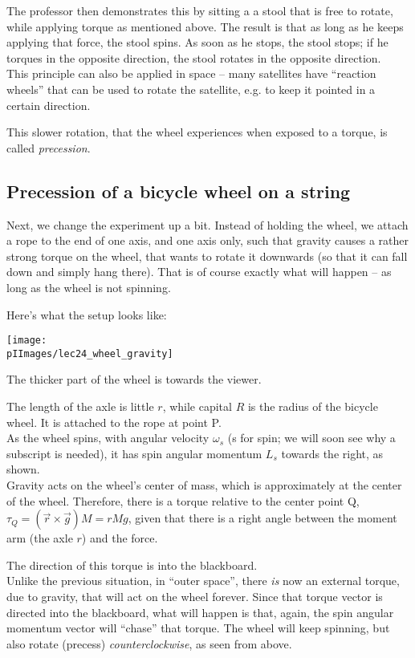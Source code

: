 The professor then demonstrates this by sitting a a stool that is free to rotate, while applying torque as mentioned above. The result is that as long as he keeps applying that force, the stool spins. As soon as he stops, the stool stops; if he torques in the opposite direction, the stool rotates in the opposite direction.\\
This principle can also be applied in space -- many satellites have ``reaction wheels'' that can be used to rotate the satellite, e.g. to keep it pointed in a certain direction.

This slower rotation, that the wheel experiences when exposed to a torque, is called \emph{precession}.

\subsection{Precession of a bicycle wheel on a string}

Next, we change the experiment up a bit. Instead of holding the wheel, we attach a rope to the end of one axis, and one axis only, such that gravity causes a rather strong torque on the wheel, that wants to rotate it downwards (so that it can fall down and simply hang there). That is of course exactly what will happen -- as long as the wheel is not spinning.

Here's what the setup looks like:

\begin{center}
\texttt{[image: \\pIImages/lec24\_wheel\_gravity]}
\end{center}

The thicker part of the wheel is towards the viewer.

The length of the axle is little $r$, while capital $R$ is the radius of the bicycle wheel. It is attached to the rope at point P.\\
As the wheel spins, with angular velocity $\omega_s$ (s for spin; we will soon see why a subscript is needed), it has spin angular momentum $L_s$ towards the right, as shown.\\
Gravity acts on the wheel's center of mass, which is approximately at the center of the wheel. Therefore, there is a torque relative to the center point Q, $\tau_Q = (\vec{r} \times \vec{g}) M = r M g$, given that there is a right angle between the moment arm (the axle $r$) and the force.

The direction of this torque is into the blackboard.\\
Unlike the previous situation, in ``outer space'', there \emph{is} now an external torque, due to gravity, that will act on the wheel forever. Since that torque vector is directed into the blackboard, what will happen is that, again, the spin angular momentum vector will ``chase'' that torque. The wheel will keep spinning, but also rotate (precess) \emph{counterclockwise}, as seen from above.

